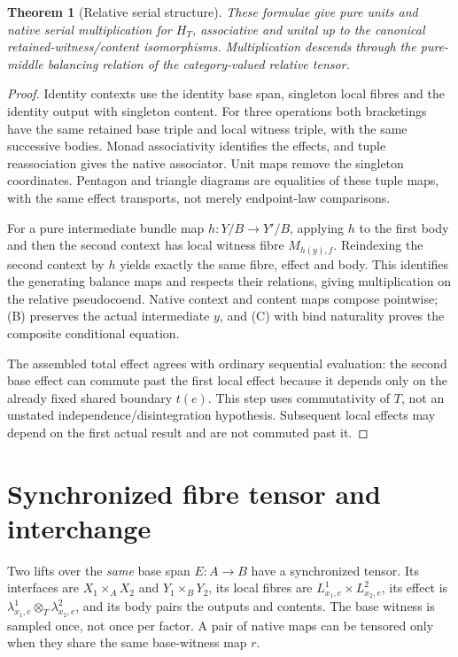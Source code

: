 \documentclass[11pt]{article}
\newtheorem{theorem}{Theorem}\newtheorem{proposition}{Proposition}\newtheorem{definition}{Definition}
\begin{document}
\begin{theorem}[Relative serial structure]
These formulae give pure units and native serial multiplication for $H_T$, associative and unital up to the canonical retained-witness/content isomorphisms. Multiplication descends through the pure-middle balancing relation of the category-valued relative tensor.
\end{theorem}
\begin{proof}
Identity contexts use the identity base span, singleton local fibres and the identity output with singleton content. For three operations both bracketings have the same retained base triple and local witness triple, with the same successive bodies. Monad associativity identifies the effects, and tuple reassociation gives the native associator. Unit maps remove the singleton coordinates. Pentagon and triangle diagrams are equalities of these tuple maps, with the same effect transports, not merely endpoint-law comparisons.

For a pure intermediate bundle map $h:Y/B\to Y'/B$, applying $h$ to the first body and then the second context has local witness fibre $M_{h(y),f}$. Reindexing the second context by $h$ yields exactly the same fibre, effect and body. This identifies the generating balance maps and respects their relations, giving multiplication on the relative pseudocoend. Native context and content maps compose pointwise; (B) preserves the actual intermediate $y$, and (C) with bind naturality proves the composite conditional equation.

The assembled total effect agrees with ordinary sequential evaluation: the second base effect can commute past the first local effect because it depends only on the already fixed shared boundary $t(e)$. This step uses commutativity of $T$, not an unstated independence/disintegration hypothesis. Subsequent local effects may depend on the first actual result and are not commuted past it.
\end{proof}

\section{Synchronized fibre tensor and interchange}
Two lifts over the \emph{same} base span $E:A\to B$ have a synchronized tensor. Its interfaces are $X_1\times_A X_2$ and $Y_1\times_B Y_2$, its local fibres are $L^1_{x_1,e}\times L^2_{x_2,e}$, its effect is $\lambda^1_{x_1,e}\otimes_T\lambda^2_{x_2,e}$, and its body pairs the outputs and contents. The base witness is sampled once, not once per factor. A pair of native maps can be tensored only when they share the same base-witness map $r$.
\end{document}
